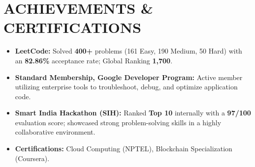 \documentclass[letterpaper,11pt]{article}
\newcommand{\resumeItem}[1]{\item\small{{#1 \vspace{-1pt}}}}
\newcommand{\resumeItemListStart}{\begin{itemize}}
\newcommand{\resumeItemListEnd}{\end{itemize}\vspace{0pt}}
\begin{document}
\section{ACHIEVEMENTS \& CERTIFICATIONS}
    \resumeItemListStart
        \resumeItem{\textbf{LeetCode:} Solved \textbf{400+} problems (161 Easy, 190 Medium, 50 Hard) with an \textbf{82.86\%} acceptance rate; Global Ranking \textbf{1,700}.}
        \resumeItem{\textbf{Standard Membership, Google Developer Program:} Active member utilizing enterprise tools to troubleshoot, debug, and optimize application code.}
        \resumeItem{\textbf{Smart India Hackathon (SIH):} Ranked \textbf{Top 10} internally with a \textbf{97/100} evaluation score; showcased strong problem-solving skills in a highly collaborative environment.}
        \resumeItem{\textbf{Certifications:} Cloud Computing (NPTEL), Blockchain Specialization (Coursera).}
    \resumeItemListEnd
\end{document}

